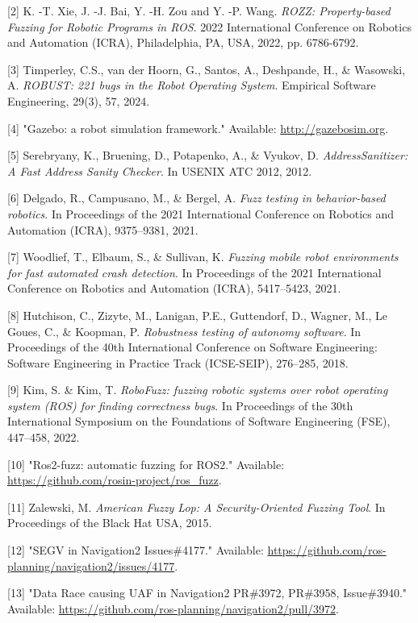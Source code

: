 \documentclass[zihao=-4]{ctexart}
\begin{document}
[2] K. -T. Xie, J. -J. Bai, Y. -H. Zou and Y. -P. Wang. \textit{ROZZ: Property-based Fuzzing for Robotic Programs in ROS}. 2022 International Conference on Robotics and Automation (ICRA), Philadelphia, PA, USA, 2022, pp. 6786-6792.

[3] Timperley, C.S., van der Hoorn, G., Santos, A., Deshpande, H., \& Wasowski, A. \textit{ROBUST: 221 bugs in the Robot Operating System}. Empirical Software Engineering, 29(3), 57, 2024.

[4] "Gazebo: a robot simulation framework." Available: \url{http://gazebosim.org}.

[5] Serebryany, K., Bruening, D., Potapenko, A., \& Vyukov, D. \textit{AddressSanitizer: A Fast Address Sanity Checker}. In USENIX ATC 2012, 2012.

[6] Delgado, R., Campusano, M., \& Bergel, A. \textit{Fuzz testing in behavior-based robotics}. In Proceedings of the 2021 International Conference on Robotics and Automation (ICRA), 9375–9381, 2021.

[7] Woodlief, T., Elbaum, S., \& Sullivan, K. \textit{Fuzzing mobile robot environments for fast automated crash detection}. In Proceedings of the 2021 International Conference on Robotics and Automation (ICRA), 5417–5423, 2021.

[8] Hutchison, C., Zizyte, M., Lanigan, P.E., Guttendorf, D., Wagner, M., Le Goues, C., \& Koopman, P. \textit{Robustness testing of autonomy software}. In Proceedings of the 40th International Conference on Software Engineering: Software Engineering in Practice Track (ICSE-SEIP), 276–285, 2018.

[9] Kim, S. \& Kim, T. \textit{RoboFuzz: fuzzing robotic systems over robot operating system (ROS) for finding correctness bugs}. In Proceedings of the 30th International Symposium on the Foundations of Software Engineering (FSE), 447–458, 2022.

[10] "Ros2-fuzz: automatic fuzzing for ROS2." Available: \url{https://github.com/rosin-project/ros\_fuzz}.

[11] Zalewski, M. \textit{American Fuzzy Lop: A Security-Oriented Fuzzing Tool}. In Proceedings of the Black Hat USA, 2015.

[12] "SEGV in Navigation2 Issues\#4177." Available: \url{https://github.com/ros-planning/navigation2/issues/4177}.

[13] "Data Race causing UAF in Navigation2 PR\#3972, PR\#3958, Issue\#3940." Available: \url{https://github.com/ros-planning/navigation2/pull/3972}.
\end{document}

